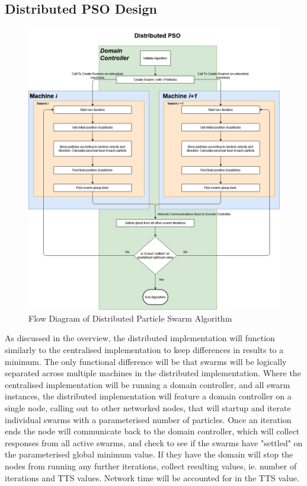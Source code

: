 \documentclass[oneside,12pt]{book}
\begin{document}
\subsection{Distributed PSO Design}
\begin{figure}[H]
    \centering
    \includegraphics[scale=0.4]{Images/FlowDiagramDistibutedPSO.png}
    \caption{Flow Diagram of Distributed Particle Swarm Algorithm}
    \label{fig:Flow Diagram of Distributed Particle Swarm Algorithm}
\end{figure}
As discussed in the overview, the distributed implementation will function similarly to the centralised implementation to keep differences in results to a minimum. The only functional difference will be that swarms will be logically separated across multiple machines in the distributed implementation. Where the centralised implementation will be running a domain controller, and all swarm instances, the distributed implementation will feature a domain controller on a single node, calling out to other networked nodes, that will startup and iterate individual swarms with a parameterised number of particles. Once an iteration ends the node will communicate back to the domain controller, which will collect responses from all active swarms, and check to see if the swarms have "settled" on the parameterised global minimum value. 
If they have the domain will stop the nodes from running any further iterations, collect resulting values, ie. number of iterations and TTS values. Network time will be accounted for in the TTS value.
\end{document}

